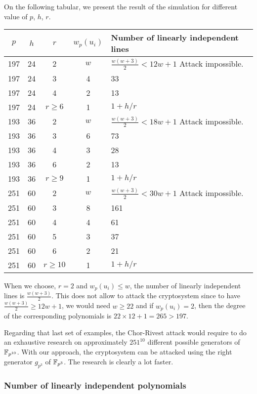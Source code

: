 \documentclass[12pt,a4paper,titlepage]{article}
\begin{document}
On the following tabular, we present the result of the simulation for different value of $p$, $h$, $r$.


\begin{tabular}{|c|c|c|c|l|}
\hline
$p$ & $h$ & $r$ & $w_p(u_i)$ & Number of linearly independent lines  \\
\hline
197 & 24 & 2 & $w$ & $\frac{w(w+3)}{2} < 12w+1$ Attack impossible. \\
\hline
197 & 24 & 3 & 4 & 33\\
\hline
197 & 24 & 4 & 2 & 13\\
\hline
197 & 24 & $r \geq 6$ & 1 & $1 + h/r$ \\
\hline
193 & 36 & 2 & $w$ & $\frac{w(w+3)}{2} < 18w+1$ Attack impossible. \\
\hline
193 & 36 & 3 & 6 & 73\\
\hline
193 & 36 & 4 & 3 & 28\\
\hline
193 & 36 & 6 & 2 & 13\\
\hline
193 & 36 & $r \geq 9$ & 1 & $1 + h/r$ \\
\hline
251 & 60 & 2 & $w$ & $\frac{w(w+3)}{2} < 30w+1$ Attack impossible. \\
\hline
251 & 60 & 3 & 8 & 161\\
\hline
251 & 60 & 4 & 4 & 61\\
\hline
251 & 60 & 5 & 3 & 37\\
\hline
251 & 60 & 6 & 2 & 21\\
\hline
251 & 60 & $r \geq 10$ & 1 & $1 + h/r$ \\
\hline
\end{tabular}

When we choose, $r = 2$ and $w_p(u_i) \leq w$, the number of linearly independent lines is $\frac{w(w+3)}{2}$. This does not allow to attack the cryptosystem since to have $\frac{w(w+3)}{2} \geq 12w+1$, we would need $w \geq 22$ and if $w_p(u_i) = 2$, then the degree of the corresponding polynomials is $22 \times 12+1 = 265 > 197$.

Regarding that last set of examples, the Chor-Rivest attack would require to do an exhaustive research on approximately $251^{10}$ different possible generators of $\mathbb{F}_{p^{10}}$. With our approach, the cryptosystem can be attacked using the right generator $g_{p^3}$ of $\mathbb{F}_{p^3}$. The research is clearly a lot faster.

\subsubsection{Number of linearly independent polynomials}
\end{document}
